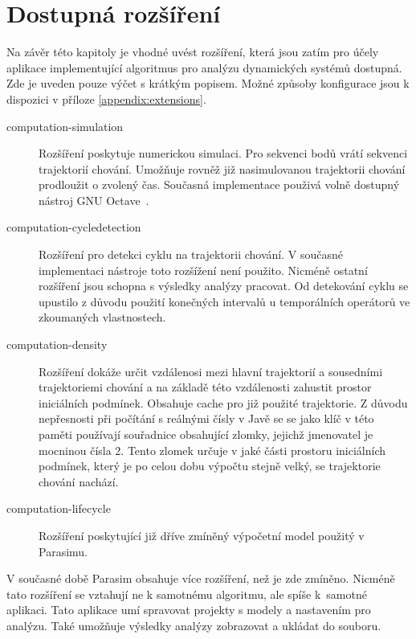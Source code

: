 \section{Dostupná rozšíření}

Na závěr této kapitoly je vhodné uvést rozšíření, která jsou zatím pro účely aplikace
implementující algoritmus pro analýzu dynamických systémů dostupná. Zde je uveden pouze výčet
s krátkým popisem. Možné způsoby konfigurace jsou k dispozici v příloze \ref{appendix:extensions}.

\begin{description}

	\item[computation-simulation] 		Rozšíření poskytuje numerickou simulaci. Pro se\-kven\-ci bodů vrátí
										sekvenci trajektorií chování. Umožňuje rovněž již nasimulovanou trajektorii
										chování prodloužit o zvolený čas. Současná implementace použivá volně dostupný
										nástroj GNU Octave~\cite{eaton2008}. 

    \item[computation-cycledetection]	Rozšíření pro detekci cyklu na trajektorii cho\-vá\-ní. V současné
										implementaci nástroje toto rozšížení není použito. Nicméně ostatní
										rozšíření jsou schopna s výsledky analýzy pracovat. Od detekování
										cyklu se upustilo z důvodu použití konečných intervalů u
										temporálních operátorů ve zkoumaných vlastnostech.

    \item[computation-density]			Rozšíření dokáže určit vzdálenosi mezi hlavní trajektorií a sousedními trajektoriemi chování a na
										základě této vzdá\-le\-nos\-ti zahustit prostor iniciálních podmínek. Obsahuje cache pro
										již použité trajektorie. Z důvodu nepřesnosti při počítání s reálnými čísly v Javě se
										se jako klíč v této paměti používají souřadnice obsahující zlomky, jejichž jmenovatel
										je mocninou čísla 2. Tento zlomek určuje v jaké části prostoru iniciálních podmínek,
										který je po celou dobu výpočtu stejně velký, se trajektorie chování nachází.

	\item[computation-lifecycle]		Rozšíření poskytující již dříve zmíněný výpočetní model použitý v Parasimu. 

\end{description}

V současné době Parasim obsahuje více rozšíření, než je zde zmíněno. Nicméně tato rozšíření se vztahují ne k samotnému
algoritmu, ale spíše k~samotné aplikaci. Tato aplikace umí spravovat projekty s modely a nastavením
pro analýzu. Také umožňuje výsledky analýzy zobrazovat a ukládat do souboru.
